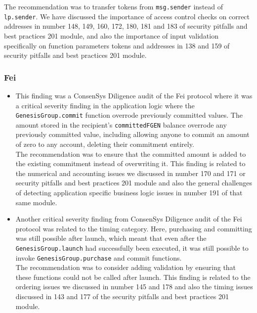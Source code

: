 The recommendation was to transfer tokens from \texttt{msg.sender}
instead of \texttt{lp.sender}. We have discussed the importance of
access control checks on correct addresses in number 148, 149, 160, 172,
180, 181 and 183 of security pitfalls and best practices 201 module, and
also the importance of input validation specifically on function
parameters tokens and addresses in 138 and 159 of security pitfalls and
best practices 201 module.

\subsubsection{Fei}\label{fei}

\begin{itemize}
\item
  This finding was a ConsenSys Diligence audit of the Fei protocol where
  it was a critical severity finding in the application logic where the
  \texttt{GenesisGroup.commit} function overrode previously committed
  values. The amount stored in the recipient's \texttt{committedFGEN}
  balance overrode any previously committed value, including allowing
  anyone to commit an amount of zero to any account, deleting their
  commitment entirely.\\

  The recommendation was to ensure that the committed amount is added to
  the existing commitment instead of overwriting it. This finding is
  related to the numerical and accounting issues we discussed in number
  170 and 171 or security pitfalls and best practices 201 module and
  also the general challenges of detecting application specific business
  logic issues in number 191 of that same module.
\item
  Another critical severity finding from ConsenSys Diligence audit of
  the Fei protocol was related to the timing category. Here, purchasing
  and committing was still possible after launch, which meant that even
  after the \texttt{GenesisGroup.launch} had successfully been executed,
  it was still possible to invoke \texttt{GenesisGroup.purchase} and
  commit functions.\\

  The recommendation was to consider adding validation by ensuring that
  these functions could not be called after launch. This finding is
  related to the ordering issues we discussed in number 145 and 178 and
  also the timing issues discussed in 143 and 177 of the security
  pitfalls and best practices 201 module.
\end{itemize}

